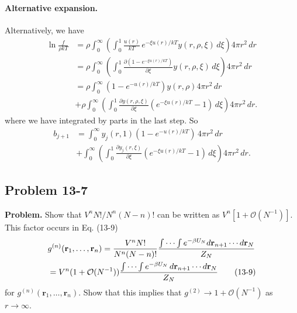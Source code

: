 \documentclass[twocolumn, 10pt]{article}
\numberwithin{equation}{section}
\newenvironment{problem}
{\par\medskip \color{problue}
  \textbf{Problem. }\ignorespaces}
{\medskip}
\newenvironment{solution}[1][\empty]
{\par\medskip\sffamily
  \textbf{\ifx\empty#1{Solution.}\relax\else{#1}\fi} \ignorespaces}
{\medskip}
\begin{document}
\begin{solution}
\paragraph*{Alternative expansion.}

  Alternatively,
  we have
  \begin{align*}
    \ln \frac{ f } { \rho k T }
    &=
    \rho
    \int_0^\infty
    \left(
      \int_0^1
      \frac{u(r)} {kT} \, e^{-\xi u(r)/kT}
      y(r, \rho, \xi) \, d\xi \right)
     4 \pi r^2 \, dr
    \\
    &=
    \rho
    \int_0^\infty
    \left(
      \int_0^1
      \frac{ \partial (1 - e^{-\xi u(r)/kT}) } { \partial \xi }
      y(r, \rho, \xi) \, d\xi
    \right)
     4 \pi r^2 \, dr
    \\
    &=
    \rho
    \int_0^\infty
      (1 - e^{-u(r)/kT})
      y(r, \rho)
     4 \pi r^2 \, dr
    \\
    &+\rho
    \int_0^\infty
    \left(
      \int_0^1
      \frac{ \partial y(r, \rho, \xi) } { \partial \xi}
      (e^{-\xi u(r)/kT} - 1)
      \, d\xi \right)
     4 \pi r^2 \, dr
    .
  \end{align*}
  where we have integrated by parts in the last step.
  So
  \begin{align*}
    b_{j+1}
    &=
    \int_0^\infty
      y_j(r, 1) (1 - e^{-u(r)/kT})
      \, 4 \pi r^2 \, dr
    \\
    &+
    \int_0^\infty
      \left(
        \int_0^1 \frac{ \partial y_j(r, \xi) } { \partial \xi}
        (e^{-\xi u(r)/kT} - 1) \, d\xi
      \right)
    4 \pi r^2 \, dr
    .
  \end{align*}
\end{solution}


\subsection{Problem 13-7}

\begin{problem}
  Show that $V^n N! / N^n (N-n)!$
  can be written as $V^n[1 + \mathcal O(N^{-1})]$.
  This factor occurs in Eq. (13-9)
  \begin{align}
    &g^{(n)}(\mathbf r_1, \dots, \mathbf r_n)
    =
    \frac{ V^n N! } { N^n (N-n)! }
    \frac{
      \int\cdots\int e^{-\beta U_N} d\mathbf r_{n+1}\cdots d\mathbf r_N
    } { Z_N }
    \notag
    \\
    &=
    V^n(1 + \mathcal O(N^{-1}))
    \frac{
      \int\cdots\int e^{-\beta U_N} \, d\mathbf r_{n+1}\cdots d\mathbf r_N
    } { Z_N }
    \label{eq:gn_def}
    \tag{13-9}
  \end{align}
  for $g^{(n)}(\mathbf r_1, \dots, \mathbf r_n)$.
  Show that this implies that
  $g^{(2)} \to 1 + \mathcal O(N^{-1})$ as $r \to \infty$.
\end{problem}
\end{document}
